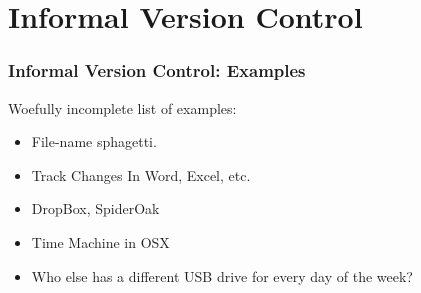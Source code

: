 \documentclass{beamer}
\begin{document}
\section{Informal Version Control} %

\begin{frame} %
  \frametitle{Informal Version Control: Examples}
  {\large Woefully incomplete list of examples:}
  \bigskip
  \begin{itemize}
  \item File-name sphagetti.
  \item Track Changes In Word, Excel, etc.
  \item DropBox, SpiderOak
  \item Time Machine in OSX
  \item Who else has a different USB drive for every day of the week?
  \end{itemize} 
\end{frame}
\end{document}
